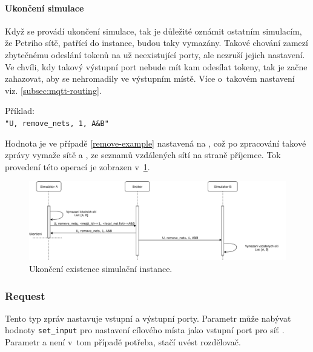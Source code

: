 \paragraph{Ukončení simulace}

Když se provádí ukončení simulace, tak je důležité oznámit ostatním simulacím, že Petriho sítě, patřící do instance, budou taky vymazány. Takové chování zamezí zbytečnému odeslání tokenů na už neexistující porty, ale nezruší jejich nastavení. Ve chvíli, kdy takový výstupní port nebude mít kam odesílat tokeny, tak je začne zahazovat, aby se nehromadily ve výstupním místě. Více o~takovém nastavení viz. \ref{subsec:mqtt-routing}.

\begin{tabbing}
  \label{remove-example}
  Příklad: \= \\
  \>\texttt{"U, remove\_nets, 1, A\&B"}
\end{tabbing}

Hodnota  je ve případě \ref{remove-example} nastavená na , což po zpracování takové zprávy vymaže sítě  a , ze seznamů vzdálených sítí na straně příjemce. Tok provedení této operací je zobrazen v~\ref{sim-unregister-viz}.

\begin{figure}[hbt]
  \centering
  \includegraphics[width=1\textwidth]{obrazky-figures/sim-unregister.pdf}
  \caption{Ukončení existence simulační instance.}
  \label{sim-unregister-viz}
\end{figure}

\subsubsection{Request} \label{par:request} Tento typ zpráv nastavuje vstupní a výstupní porty. Parametr  může nabývat hodnoty \texttt{set\_input} pro nastavení cílového místa  jako vstupní port pro síť . Parametr  a  není v~tom případě potřeba, stačí uvést rozdělovač.

